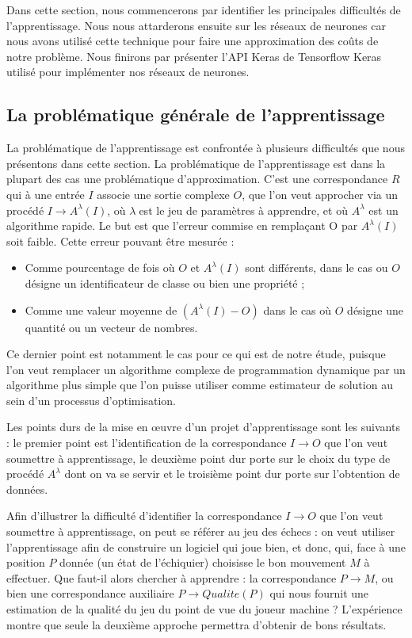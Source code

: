 Dans cette section, nous commencerons par identifier les principales difficultés de l'apprentissage. Nous nous attarderons ensuite sur les réseaux de neurones car nous avons utilisé cette technique pour faire une approximation des coûts de notre problème. Nous finirons par présenter l'API Keras de Tensorflow Keras utilisé pour implémenter nos réseaux de neurones.

\subsection{La problématique générale de l'apprentissage}


La problématique de l'apprentissage est confrontée à plusieurs difficultés que nous présentons dans cette section.
La problématique de l'apprentissage est dans la plupart des cas une
problématique d'approximation. C'est une correspondance $R$ qui à une entrée $I$
associe une sortie complexe $O$, que l'on veut approcher via un procédé $I  \rightarrow A^\lambda(I)$,
où $\lambda$est le jeu de paramètres à apprendre, et où $A^\lambda$ est un algorithme
rapide. Le but est que l'erreur commise en remplaçant O par $A^\lambda(I)$ soit faible. Cette erreur
pouvant être mesurée :
\begin{itemize}[label=$\square$]
\item Comme pourcentage de fois où $O$ et $A^\lambda(I)$ sont différents, dans le cas ou
$O$ désigne un identificateur de classe ou bien une propriété ;
\item Comme une valeur moyenne
de $(A^\lambda(I)- O)$ dans le cas où $O$ désigne une quantité ou un vecteur de nombres. 
\end{itemize}
Ce dernier point est
notamment le cas pour ce qui est de notre étude, puisque l'on veut remplacer un algorithme
complexe de programmation dynamique par un algorithme plus simple que l'on puisse utiliser
comme estimateur de solution au sein d'un processus d'optimisation.

Les points durs de la mise en œuvre d'un projet d'apprentissage sont les
suivants : le premier point est l'identification de la correspondance $I \rightarrow O$ que l'on veut soumettre
à apprentissage, le deuxième point dur porte sur le choix du type de procédé $A^\lambda$ dont on va se servir et le troisième point dur porte sur l'obtention de données.
	
	Afin d'illustrer la difficulté d'identifier la correspondance $I \rightarrow O$ que l'on veut soumettre
	 à apprentissage, on peut se référer au jeu des échecs : on
	veut utiliser l'apprentissage afin de construire un logiciel qui joue bien, et donc, qui, face
	à une position $P$ donnée (un état de l'échiquier) choisisse le bon mouvement $M$ à
	effectuer. Que faut-il alors chercher à apprendre : la correspondance $P \rightarrow 
	M$, ou bien une correspondance auxiliaire $P \rightarrow Qualite(P)$ qui nous fournit une estimation
	de la qualité du jeu du point de vue du joueur machine ? L'expérience montre que seule
	la deuxième approche permettra d'obtenir de bons résultats.
	
